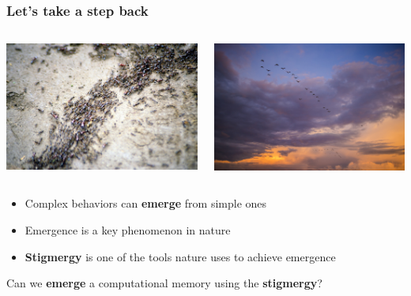 \documentclass{beamer}
\begin{document}
\begin{frame}
    \frametitle{Let's take a step back}
    \pause
    \begin{columns}
        \begin{column}{0.5\textwidth}
            \includegraphics[width=\textwidth]{img/ants.jpg}
        \end{column}
        \pause
        \begin{column}{0.5\textwidth}
            \includegraphics[width=\textwidth]{img/birds.jpg}
        \end{column}
        \pause
    \end{columns}
    \vspace{0.5cm}
    \begin{itemize}
        \item Complex behaviors can \textbf{emerge} from simple ones
        \item Emergence is a key phenomenon in nature
        \item \textbf{Stigmergy} is one of the tools nature uses to achieve emergence
    \end{itemize}
    \vspace{0.3cm}
    \pause
    \begin{center}
        Can we \textbf{emerge} a computational memory using the \textbf{stigmergy}?
    \end{center}
\end{frame}
\end{document}
